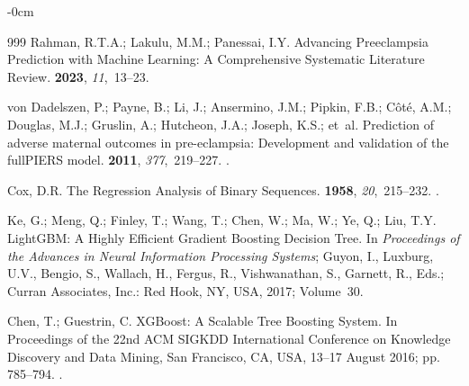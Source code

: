 \documentclass[diagnostics,article,accept,pdftex,moreauthors]{Definitions/mdpi}
\begin{document}
\begin{adjustwidth}{-\extralength}{0cm}
\begin{thebibliography}{999}
Rahman, R.T.A.; Lakulu, M.M.; Panessai, I.Y.
\newblock Advancing Preeclampsia Prediction with Machine Learning: A
  Comprehensive Systematic Literature Review.
 {\bf 2023}, {\em 11},~13--23.

von Dadelszen, P.; Payne, B.; Li, J.; Ansermino, J.M.; Pipkin, F.B.; Côté, A.M.; Douglas, M.J.; Gruslin, A.; Hutcheon, J.A.; Joseph, K.S.; et~al.
\newblock Prediction of adverse maternal outcomes in pre-eclampsia: Development
  and validation of the fullPIERS model.
 {\bf 2011}, {\em 377},~219--227.
.

Cox, D.R.
\newblock The Regression Analysis of Binary Sequences.
 {\bf 1958}, {\em 20},~215--232.
.

Ke, G.; Meng, Q.; Finley, T.; Wang, T.; Chen, W.; Ma, W.; Ye, Q.; Liu, T.Y.
\newblock LightGBM: A Highly Efficient Gradient Boosting Decision Tree.
\newblock In \emph{Proceedings of the Advances in Neural Information Processing
  Systems}; Guyon, I., Luxburg, U.V., Bengio, S., Wallach, H., Fergus, R.,
  Vishwanathan, S., Garnett, R., Eds.; {Curran Associates, Inc.:
    Red Hook, NY, USA, } %
 2017; Volume~30.

Chen, T.; Guestrin, C.
\newblock XGBoost: A Scalable Tree Boosting System.
\newblock In Proceedings of the  22nd ACM SIGKDD
  International Conference on Knowledge Discovery and Data Mining,
  {San Francisco, CA, USA,  13--17  August} %
 2016; pp.
  785--794.
.


\end{thebibliography}
\end{adjustwidth}
\end{document}
